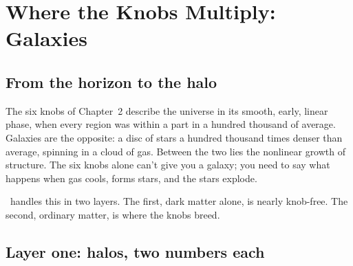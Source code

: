 \chapter{Where the Knobs Multiply: Galaxies}




\section{From the horizon to the halo}

The six knobs of Chapter~2 describe the universe in its smooth, early, linear phase, when every region was within a part in a hundred thousand of average. Galaxies are the opposite: a disc of stars a hundred thousand times denser than average, spinning in a cloud of gas. Between the two lies the nonlinear growth of structure. The six knobs alone can't give you a galaxy; you need to say what happens when gas cools, forms stars, and the stars explode.

\LCDM\ handles this in two layers. The first, dark matter alone, is nearly knob-free. The second, ordinary matter, is where the knobs breed.

\section{Layer one: halos, two numbers each}

